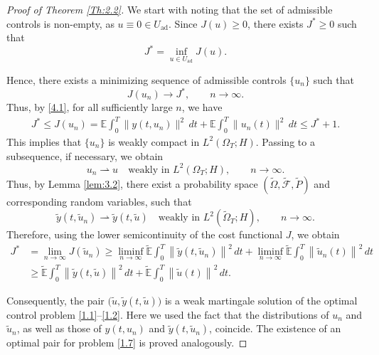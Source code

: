 \documentclass[a4paper,12pt]{article}
\numberwithin{equation}{section}
\begin{document}
\begin{proof}[Proof of Theorem \ref{Th:2.2}] We start with noting that the set of admissible controls is non-empty, as $u \equiv 0 \in U_{\mathrm{ad}}$. Since $J(u)\geq 0$, there exists
$J^*\geq 0$ such that
\begin{equation}
J^*
=
\inf_{u\in U_{\mathrm{ad}}}J(u).
\label{4.1}
\end{equation}

Hence, there exists a minimizing sequence of admissible controls
$\{u_n\}$ such that
\begin{equation}
J(u_n)\longrightarrow J^*,
\qquad n\to\infty.
\label{4.2}
\end{equation}
Thus, by \eqref{4.1}, for all sufficiently large $n$, we have
\[
\begin{aligned}
J^*
\leq J(u_n)
=
\mathbb{E}\int_0^T
\|y(t,u_n)\|^2\,dt
+
\mathbb{E}\int_0^T
\|u_n(t)\|^2\,dt
\leq J^*+1.
\end{aligned}
\]
This implies that $\{u_n\}$ is weakly compact in $L^2(\Omega_T;H)$.
Passing to a subsequence, if necessary, we obtain
\begin{equation}
u_n\rightharpoonup u
\quad\text{weakly in }L^2(\Omega_T;H),
\qquad n\to\infty.
\label{4.3}
\end{equation}
Thus, by Lemma \ref{lem:3.2}, there exist a probability space
$(\widetilde{\Omega},\widetilde{\mathcal{F}},\widetilde{P})$ and corresponding 
random variables, such that
\[
\widetilde{y}(t,\widetilde{u}_n)
\rightharpoonup
\widetilde{y}(t,\widetilde{u})
\quad\text{weakly in }
L^2(\widetilde{\Omega}_T;H),
\qquad n\to\infty.
\]
Therefore, using the lower semicontinuity of the cost functional $J$,
we obtain
\[
\begin{aligned}
J^*
&=
\lim_{n\to\infty}J(\widetilde{u}_n)
\geq
\liminf_{n\to\infty}
\widetilde{\mathbb{E}}
\int_0^T
\left\|
\widetilde{y}(t,\widetilde{u}_n)
\right\|^2\,dt
+
\liminf_{n\to\infty}
\widetilde{\mathbb{E}}
\int_0^T
\left\|
\widetilde{u}_n(t)
\right\|^2\,dt
\\
&\geq
\widetilde{\mathbb{E}}
\int_0^T
\left\|
\widetilde{y}(t,\widetilde{u})
\right\|^2\,dt
+
\widetilde{\mathbb{E}}
\int_0^T
\left\|
\widetilde{u}(t)
\right\|^2\,dt.
\end{aligned}
\]

Consequently, the pair
$\bigl(\widetilde{u},\widetilde{y}(t,\widetilde{u})\bigr)$ is a weak
martingale solution of the optimal control problem
\eqref{1.1}--\eqref{1.2}. Here we used the fact that the
distributions of $u_n$ and $\widetilde{u}_n$, as well as those of
$y(t,u_n)$ and $\widetilde{y}(t,\widetilde{u}_n)$, coincide.
The existence of an optimal pair for problem \eqref{1.7} is proved
analogously.
\end{proof}
\end{document}
